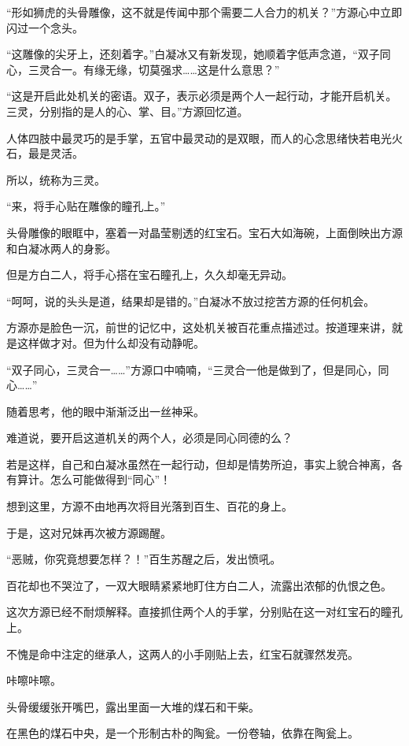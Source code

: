 
\begin{this_body}

“形如狮虎的头骨雕像，这不就是传闻中那个需要二人合力的机关？”方源心中立即闪过一个念头。

“这雕像的尖牙上，还刻着字。”白凝冰又有新发现，她顺着字低声念道，“双子同心，三灵合一。有缘无缘，切莫强求……这是什么意思？”

“这是开启此处机关的密语。双子，表示必须是两个人一起行动，才能开启机关。三灵，分别指的是人的心、掌、目。”方源回忆道。

人体四肢中最灵巧的是手掌，五官中最灵动的是双眼，而人的心念思绪快若电光火石，最是灵活。

所以，统称为三灵。

“来，将手心贴在雕像的瞳孔上。”

头骨雕像的眼眶中，塞着一对晶莹剔透的红宝石。宝石大如海碗，上面倒映出方源和白凝冰两人的身影。

但是方白二人，将手心搭在宝石瞳孔上，久久却毫无异动。

“呵呵，说的头头是道，结果却是错的。”白凝冰不放过挖苦方源的任何机会。

方源亦是脸色一沉，前世的记忆中，这处机关被百花重点描述过。按道理来讲，就是这样做才对。但为什么却没有动静呢。

“双子同心，三灵合一……”方源口中喃喃，“三灵合一他是做到了，但是同心，同心……”

随着思考，他的眼中渐渐泛出一丝神采。

难道说，要开启这道机关的两个人，必须是同心同德的么？

若是这样，自己和白凝冰虽然在一起行动，但却是情势所迫，事实上貌合神离，各有算计。怎么可能做得到“同心”！

想到这里，方源不由地再次将目光落到百生、百花的身上。

于是，这对兄妹再次被方源踢醒。

“恶贼，你究竟想要怎样？！”百生苏醒之后，发出愤吼。

百花却也不哭泣了，一双大眼睛紧紧地盯住方白二人，流露出浓郁的仇恨之色。

这次方源已经不耐烦解释。直接抓住两个人的手掌，分别贴在这一对红宝石的瞳孔上。

不愧是命中注定的继承人，这两人的小手刚贴上去，红宝石就骤然发亮。

咔嚓咔嚓。

头骨缓缓张开嘴巴，露出里面一大堆的煤石和干柴。

在黑色的煤石中央，是一个形制古朴的陶瓮。一份卷轴，依靠在陶瓮上。


\end{this_body}
